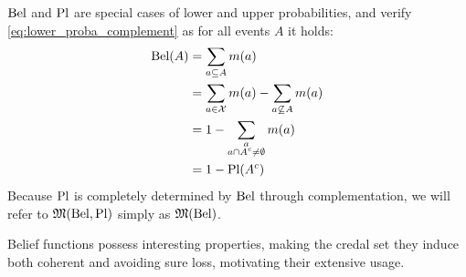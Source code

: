 $\mathrm{Bel}$ and $\mathrm{Pl}$ are special cases of lower and upper probabilities, and verify \eqref{eq:lower_proba_complement} as for all events $A$ it holds:
\begin{align*}
    \mathrm{Bel}(A)&=\sum_{a\subseteq A} m(a)\\
    &= \sum_{a\in \mathcal{X}} m(a) - \sum_{a\not\subseteq A} m(a)\\
    &= 1 - \sum_{\substack{a\\a\cap A^c\neq\emptyset}} m(a)\\
    &=1-\mathrm{Pl}(A^c)
\end{align*}
Because $\mathrm{Pl}$ is completely determined by $\mathrm{Bel}$ through complementation, we will refer to $\mathfrak{M}(\mathrm{Bel},\mathrm{Pl})$ simply as $\mathfrak{M}(\mathrm{Bel})$.

Belief functions possess interesting properties, making the credal set they induce both coherent and avoiding sure loss, motivating their extensive usage.

